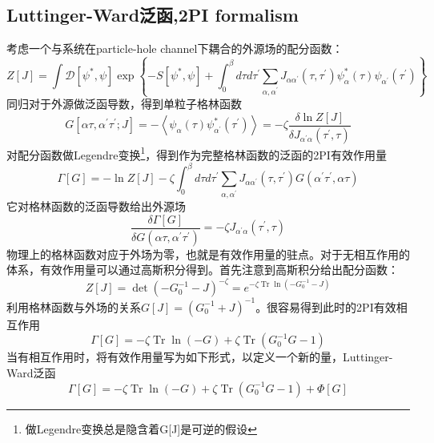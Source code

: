 \documentclass[10pt,openany]{book}
\theoremstyle{thmstyle} %
\theoremstyle{defstyle} %
\theoremstyle{prostyle} %
\begin{document}
\subsection{Luttinger-Ward泛函,2PI formalism}
考虑一个与系统在particle-hole channel下耦合的外源场的配分函数：
\begin{equation*}
  Z[J]=\int \mathcal{D}\left[\psi^*, \psi\right] \exp \left\{-S\left[\psi^*, \psi\right]+\int_0^\beta d \tau d \tau^{\prime} \sum_{\alpha, \alpha^{\prime}} J_{\alpha \alpha^{\prime}}\left(\tau, \tau^{\prime}\right) \psi_\alpha^*(\tau) \psi_{\alpha^{\prime}}\left(\tau^{\prime}\right)\right\}
\end{equation*}
同归对于外源做泛函导数，得到单粒子格林函数
\begin{equation*}
  G\left[\alpha \tau, \alpha^{\prime} \tau^{\prime} ; J\right]=-\left\langle\psi_\alpha(\tau) \psi_{\alpha^{\prime}}^*\left(\tau^{\prime}\right)\right\rangle=-\zeta \frac{\delta \ln Z[J]}{\delta J_{\alpha^{\prime} \alpha}\left(\tau^{\prime}, \tau\right)}
\end{equation*}
对配分函数做Legendre变换\footnote{做Legendre变换总是隐含着G[J]是可逆的假设}，得到作为完整格林函数的泛函的2PI有效作用量
\begin{equation*}
  \Gamma[G]=-\ln Z[J]-\zeta \int_0^\beta d \tau d \tau^{\prime} \sum_{\alpha, \alpha^{\prime}} J_{\alpha \alpha^{\prime}}\left(\tau, \tau^{\prime}\right) G\left(\alpha^{\prime} \tau^{\prime}, \alpha \tau\right)
\end{equation*}
它对格林函数的泛函导数给出外源场
\begin{equation*}
  \frac{\delta \Gamma[G]}{\delta G\left(\alpha \tau, \alpha^{\prime} \tau^{\prime}\right)}=-\zeta J_{\alpha^{\prime} \alpha}\left(\tau^{\prime}, \tau\right)
\end{equation*}
物理上的格林函数对应于外场为零，也就是有效作用量的驻点。对于无相互作用的体系，有效作用量可以通过高斯积分得到。首先注意到高斯积分给出配分函数：
\begin{equation*}
  Z[J]=\operatorname{det}\left(-G_0^{-1}-J\right)^{-\zeta}=e^{-\zeta \operatorname{Tr} \ln \left(-G_0^{-1}-J\right)}
\end{equation*}
利用格林函数与外场的关系$ G[J]=\left(G_0^{-1}+J\right)^{-1} $。很容易得到此时的2PI有效相互作用
\begin{equation*}
  \Gamma[G]=-\zeta \operatorname{Tr} \ln (-G)+\zeta \operatorname{Tr}\left(G_0^{-1} G-1\right)
\end{equation*}
当有相互作用时，将有效作用量写为如下形式，以定义一个新的量，Luttinger-Ward泛函
\begin{equation}
  \Gamma[G]=-\zeta \operatorname{Tr} \ln (-G)+\zeta \operatorname{Tr}\left(G_0^{-1} G-1\right)+\Phi[G]
\end{equation} 
\end{document}
